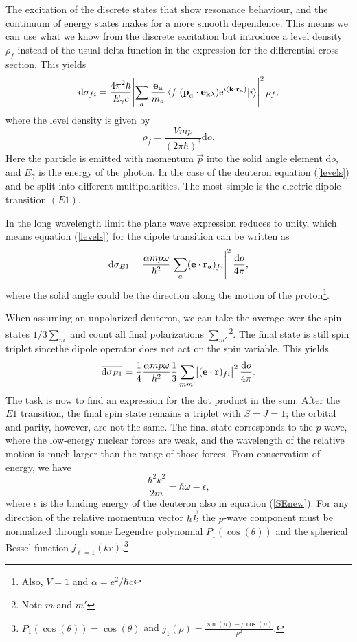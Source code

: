 The excitation of the discrete states that show resonance behaviour, and the continuum of energy states makes for a more smooth dependence. This means we can use what we know from the discrete excitation but introduce a level density $\rho_f$ instead of the usual delta function in the expression for the differential cross section. This yields
\begin{equation}\label{levels}
	\textrm{d}\sigma_{fi} = \frac{4\pi^2\hbar}{E_\gamma c}\abs{\sum_a \frac{\bm{\mathrm{e_a}}}{m_a}\mel{f}{(\bm{\mathrm{p}}_a\cdot \bm{\mathrm{e}}_{\bm{\mathrm{k}}\lambda})\textrm{e}^{i(\bm{\mathrm{k}}\cdot \bm{\mathrm{r}}_a)}}{i}}^2 \rho_f,
\end{equation}
where the level density is given by
\begin{equation}
	\rho_f = \frac{Vmp}{(2\pi\hbar)^3} \textrm{d}o.
\end{equation}
Here the particle is emitted with momentum $\vec{p}$ into the solid angle element $\textrm{d}o$, and $E_\gamma$ is the energy of the photon. In the case of the deuteron equation (\ref{levels}) and be split into different multipolarities. The most simple is the electric dipole transition $(E1)$.

In the long wavelength limit the plane wave expression reduces to unity, which means equation (\ref{levels}) for the dipole transition can be written as
\begin{equation} \label{diffE1}
	\textrm{d}\sigma_{E1} = \frac{\alpha mp\omega}{\hbar^2} \abs{\sum_a (\bm{\mathrm{e}}\cdot \bm{\mathrm{r_a}})_{fi}}^2 \frac{\textrm{d}o}{4\pi},
\end{equation}
where the solid angle could be the direction along the motion of the proton\footnote{Also, $V=1$ and $\alpha=e^2/\hbar c$}.

When assuming an unpolarized deuteron, we can take the average over the spin states $1/3 \sum_m$ and count all final polarizations $\sum_{m'}$\footnote{Note $m$ and $m'$}. The final state is still spin triplet sincethe dipole operator does not act on the spin variable. This yields
\begin{equation} \label{diffcross}
	\overline{\textrm{d}\sigma_{E1}} = \frac{1}{4}\frac{\alpha m p \omega}{\hbar^2} \frac{1}{3} \sum_{mm'}\abs{(\bm{\mathrm{e}}\cdot \bm{\mathrm{r}})_{fi}}^2 \frac{\textrm{d}o}{4\pi}.
\end{equation}
The task is now to find an expression for the dot product in the sum. After the $E1$ transition, the final spin state remains a triplet with $S=J=1$; the orbital and parity, however, are not the same. The final state corresponds to the $p$-wave, where the low-energy nuclear forces are weak, and the wavelength of the relative motion is much larger than the range of those forces. From conservation of energy, we have
\begin{equation} \label{kq}
	\frac{\hbar^2 k^2}{2m} = \hbar\omega - \epsilon,
\end{equation}
where $\epsilon$ is the binding energy of the deuteron also in equation (\ref{SEnew}). For any direction of the relative momentum vector $\hbar \vec{k}$ the $p$-wave component must be normalized through some Legendre polynomial $P_1(\cos(\theta))$ and the spherical Bessel function $j_{\ell=1}(kr)$.\footnote{$P_1(\cos(\theta))=\cos(\theta)$ and $j_1(\rho)=\frac{\sin(\rho)-\rho\cos(\rho)}{\rho^2}.$}

